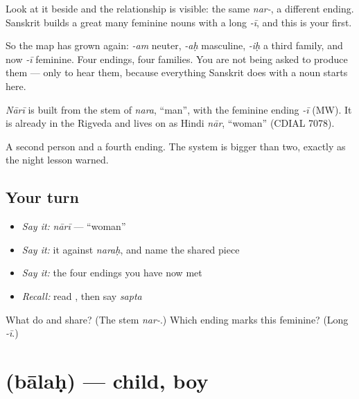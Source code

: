 Look at it beside  and the relationship is visible: the same \emph{nar-}, a different ending. Sanskrit builds a great many feminine nouns with a long \emph{-ī}, and this is your first.

So the map has grown again: \emph{-am} neuter, \emph{-aḥ} masculine, \emph{-iḥ} a third family, and now \emph{-ī} feminine. Four endings, four families. You are not being asked to produce them — only to hear them, because everything Sanskrit does with a noun starts here.

\begin{cousinweb}
\emph{Nārī} is built from the stem of \emph{nara}, \textquotedblleft{}man\textquotedblright{}, with the feminine ending \emph{-ī} (MW). It is already in the Rigveda and lives on as Hindi \emph{nār}, \textquotedblleft{}woman\textquotedblright{} (CDIAL 7078).
\end{cousinweb}

\begin{grammarlens}[title={What you've built}]
A second person and a fourth ending. The system is bigger than two, exactly as the night lesson warned.
\end{grammarlens}

\subsection*{Your turn}
\begin{itemize}
\raggedright
  \item \emph{Say it:} \emph{nārī} — \textquotedblleft{}woman\textquotedblright{}
  \item \emph{Say it:} it against \emph{naraḥ}, and name the shared piece
  \item \emph{Say it:} the four endings you have now met
  \item \emph{Recall:} read \textbf{}, then say \emph{sapta}
\end{itemize}

\begin{tcolorbox}[breakable,colback=teal!4,colframe=teal!35!black,title={Before you move on}]
What do  and  share? (The stem \emph{nar-}.) Which ending marks this feminine? (Long \emph{-ī}.)
\end{tcolorbox}
\section[\texorpdfstring{\sk{बालः} (bālaḥ)}{बालः (bālaḥ)}]{ (bālaḥ) — child, boy}

